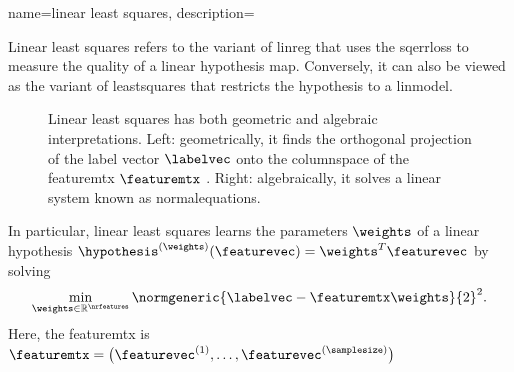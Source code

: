 {name={linear least squares},
 description={
Linear least squares refers to the 
 variant of \gls{linreg} that uses the \gls{sqerrloss} to measure the quality of 
 a linear \gls{hypothesis} \gls{map}. Conversely, it can also be viewed as the 
 variant of \gls{leastsquares} that restricts the \gls{hypothesis} to a 
 \gls{linmodel}. 
  \begin{figure}
 	\centering
 \caption{Linear least squares has both geometric and algebraic interpretations. 
 Left: geometrically, it finds the orthogonal projection of the 
 \gls{label} \gls{vector} $\labelvec$ onto the \gls{columnspace} of the 
 \gls{featuremtx} $\featuremtx$ \cite[Ch. 8]{BoydConvexBook}. Right: algebraically, it solves a linear system 
 known as \gls{normalequations}. 
 \label{fig_linleastsquares_dict}}
 \end{figure}
 In particular, linear least squares learns the \glspl{parameter} $\weights$ of a 
  linear \gls{hypothesis} 
  $\hypothesis^{(\weights)}(\featurevec) = \weights^{T} \featurevec$ by solving 
  \begin{equation} 
 	\label{eq_linleastsquares_dic}
 	\min_{\weights \in \mathbb{R}^{\nrfeatures}} \normgeneric{\labelvec - \featuremtx \weights}{2}^2.
  \end{equation} 
  Here, the \gls{featuremtx} is 
  $\featuremtx = \big(\featurevec^{(1)},\ldots,\featurevec^{(\samplesize)}\big)$ 
}}
